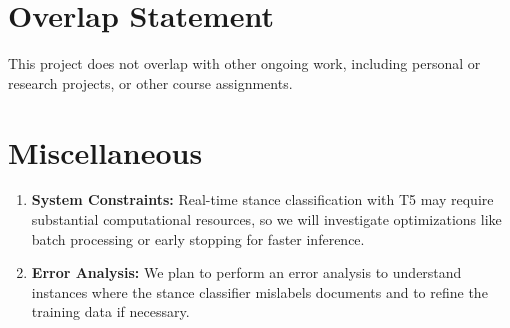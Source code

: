 \documentclass[sigconf]{acmart}
\begin{document}
\section{Overlap Statement}
This project does not overlap with other ongoing work, including personal or research projects, or other course assignments. 

\section{Miscellaneous}

\begin{enumerate}[left=0em]
    \item \textbf{System Constraints:} Real-time stance classification with T5 may require substantial computational resources, so we will investigate optimizations like batch processing or early stopping for faster inference.
    \item \textbf{Error Analysis:} We plan to perform an error analysis to understand instances where the stance classifier mislabels documents and to refine the training data if necessary.
\end{enumerate}

\balance
\end{document}
